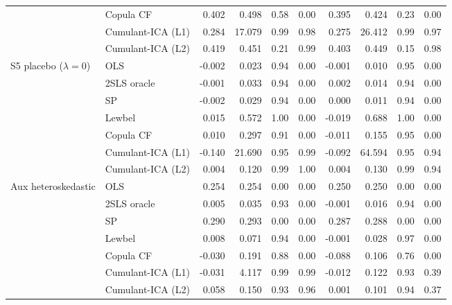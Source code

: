 \begin{table}[p]
\begin{tabular}{@{}llrrrrrrrr@{}}
 & Copula CF & 0.402 & 0.498 & 0.58 & 0.00 & 0.395 & 0.424 & 0.23 & 0.00 \\
 & Cumulant-ICA (L1) & 0.284 & 17.079 & 0.99 & 0.98 & 0.275 & 26.412 & 0.99 & 0.97 \\
 & Cumulant-ICA (L2) & 0.419 & 0.451 & 0.21 & 0.99 & 0.403 & 0.449 & 0.15 & 0.98 \\
\addlinespace
S5 placebo ($\lambda=0$) & OLS & -0.002 & 0.023 & 0.94 & 0.00 & -0.001 & 0.010 & 0.95 & 0.00 \\
 & 2SLS oracle & -0.001 & 0.033 & 0.94 & 0.00 & 0.002 & 0.014 & 0.94 & 0.00 \\
 & SP & -0.002 & 0.029 & 0.94 & 0.00 & 0.000 & 0.011 & 0.94 & 0.00 \\
 & Lewbel & 0.015 & 0.572 & 1.00 & 0.00 & -0.019 & 0.688 & 1.00 & 0.00 \\
 & Copula CF & 0.010 & 0.297 & 0.91 & 0.00 & -0.011 & 0.155 & 0.95 & 0.00 \\
 & Cumulant-ICA (L1) & -0.140 & 21.690 & 0.95 & 0.99 & -0.092 & 64.594 & 0.95 & 0.94 \\
 & Cumulant-ICA (L2) & 0.004 & 0.120 & 0.99 & 1.00 & 0.004 & 0.130 & 0.99 & 0.94 \\
\addlinespace
Aux heteroskedastic & OLS & 0.254 & 0.254 & 0.00 & 0.00 & 0.250 & 0.250 & 0.00 & 0.00 \\
 & 2SLS oracle & 0.005 & 0.035 & 0.93 & 0.00 & -0.001 & 0.016 & 0.94 & 0.00 \\
 & SP & 0.290 & 0.293 & 0.00 & 0.00 & 0.287 & 0.288 & 0.00 & 0.00 \\
 & Lewbel & 0.008 & 0.071 & 0.94 & 0.00 & -0.001 & 0.028 & 0.97 & 0.00 \\
 & Copula CF & -0.030 & 0.191 & 0.88 & 0.00 & -0.088 & 0.106 & 0.76 & 0.00 \\
 & Cumulant-ICA (L1) & -0.031 & 4.117 & 0.99 & 0.99 & -0.012 & 0.122 & 0.93 & 0.39 \\
 & Cumulant-ICA (L2) & 0.058 & 0.150 & 0.93 & 0.96 & 0.001 & 0.101 & 0.94 & 0.37 \\
\bottomrule
\end{tabular}
\end{table}
